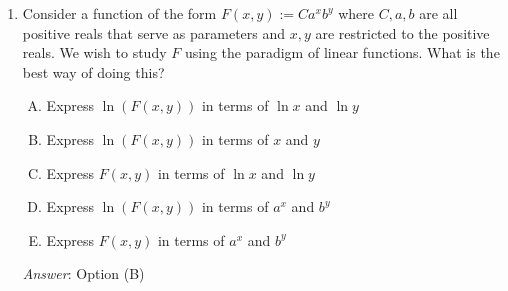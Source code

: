 \documentclass[10pt]{amsart}
\begin{document}
\begin{enumerate}
  {\em Answer}: Option (C)

  {\em Explanation}: Look for functions of the form:

  $$F(x,y,z) = f(x,y) + g(y,z) + h(x,z)$$

  where $f$, $g$, and $h$ are all nonzero and none of them is
  additively separable.

  The only option fitting this description is Option (C).

  As for the other options:

  \begin{itemize}
  \item Option (A): Both $F_{xz}$ and $F_{yz}$ are zero. This is
    because neither $x$ nor $y$ interacts with $z$.
  \item Option (B): $F_{xz}$ is zero, because there is no interaction
    between $x$ and $z$.
  \item Option (D): $F$ is completely additively separable in terms of
    $x$, $y$, and $z$, so all the second-order mixed partials
    $F_{xy}$, $F_{xz}$, and $F_{yz}$ are zero.
  \item Option (E): $F_{xyz} = 1$.
  \end{itemize}

  {\em Performance review}: $16$ out of $27$ got this. $7$ chose (E),
  $3$ chose (B), $1$ chose (A).

  {\em Historical note (last time)}: $20$ out of $29$ people got this. $8$
  chose (E), $1$ chose (D).

\item Consider a function of the form $F(x,y) := Ca^xb^y$ where
  $C,a,b$ are all positive reals that serve as parameters and $x,y$
  are restricted to the positive reals. We wish to study $F$ using the
  paradigm of linear functions. What is the best way of doing this?

  \begin{enumerate}[(A)]
  \item Express $\ln(F(x,y))$ in terms of $\ln x$ and $\ln y$
  \item Express $\ln(F(x,y))$ in terms of $x$ and $y$
  \item Express $F(x,y)$ in terms of $\ln x$ and $\ln y$
  \item Express $\ln(F(x,y))$ in terms of $a^x$ and $b^y$
  \item Express $F(x,y)$ in terms of $a^x$ and $b^y$
  \end{enumerate}

  {\em Answer}: Option (B)


\end{enumerate}
\end{document}
